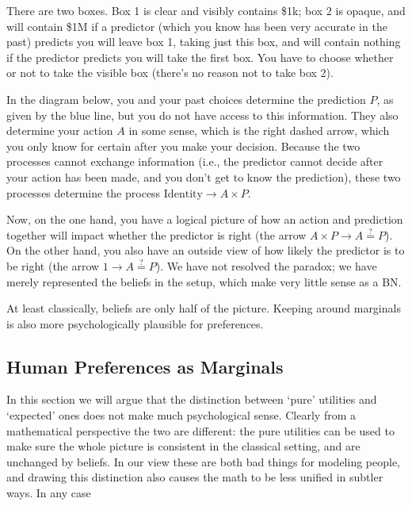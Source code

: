 \documentclass{article}
\begin{document}
	\begin{example}[Newcomb]
		There are two boxes. Box 1 is clear and visibly contains \$1k; box 2 is opaque, and will contain \$1M if a predictor (which you know has been very accurate in the past) predicts you will leave box 1, taking just this box, and will contain nothing if the predictor predicts you will take the first box. You have to choose whether or not to take the visible box (there's no reason not to take box 2).
		
		In the diagram below, you and your past choices determine the prediction $P$, as given by the blue line, but you do not have access to this information. They also determine your action $A$ in some sense, which is the right dashed arrow, which you only know for certain after you make your decision. Because the two processes cannot exchange information (i.e., the predictor cannot decide after your action has been made, and you don't get to know the prediction), these two processes determine the process $\mathrm{Identity} \to A \times P$.
		\begin{center}
		\end{center}
		Now, on the one hand, you have a logical picture of how an action and prediction together will impact whether the predictor is right (the arrow $A \times P \to A \stackrel{?}{=} P$). On the other hand, you also have an outside view of how likely the predictor is to be right (the arrow $1 \to A \stackrel{?}{=} P$). We have not resolved the paradox; we have merely represented the beliefs in the setup, which make very little sense as a BN.
	\end{example}

	At least classically, beliefs are only half of the picture. Keeping around marginals is also more psychologically plausible for preferences.

	\subsection{Human Preferences as Marginals}	\label{sec:human-pref-marginals}
	In this section we will argue that the distinction between `pure' utilities and `expected' ones does not make much psychological sense. Clearly from a mathematical perspective the two are different: the pure utilities can be used to make sure the whole picture is consistent in the classical setting, and are unchanged by beliefs. In our view these are both bad things for modeling people, and drawing this distinction also causes the math to be less unified in subtler ways. In any case
	
\end{document}

